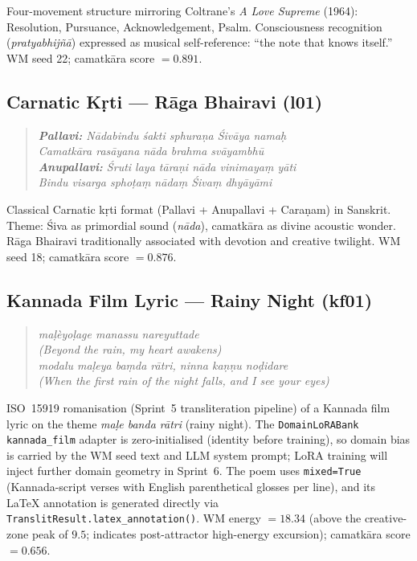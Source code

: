 \documentclass[journal,onecolumn,11pt]{IEEEtran}
\begin{document}
Four-movement structure mirroring Coltrane's \emph{A Love Supreme} (1964):
Resolution, Pursuance, Acknowledgement, Psalm.
Consciousness recognition (\emph{pratyabhijñā}) expressed as musical self-reference:
``the note that knows itself.''
WM seed 22; camatkāra score $= 0.891$.

\subsection{Carnatic Kṛti --- Rāga Bhairavi (l01)}\label{sec:l01}

\begin{quote}
\small\itshape
\textbf{Pallavi:} Nādabindu śakti sphuraṇa Śivāya namaḥ \\
Camatkāra rasāyana nāda brahma svāyambhū \\[2pt]
\textbf{Anupallavi:} Śruti laya tāraṇi nāda vinimayaṃ yāti \\
Bindu visarga sphoṭaṃ nādaṃ Śivaṃ dhyāyāmi
\end{quote}

Classical Carnatic kṛti format (Pallavi + Anupallavi + Caraṇam) in Sanskrit.
Theme: Śiva as primordial sound (\emph{nāda}), camatkāra as divine acoustic wonder.
Rāga Bhairavi traditionally associated with devotion and creative twilight.
WM seed 18; camatkāra score $= 0.876$.

\subsection{Kannada Film Lyric --- Rainy Night (kf01)}\label{sec:kf01}

\begin{quote}
\small\itshape
ma\d{l}\`{e}yo\d{l}age manassu nareyuttade \\
(Beyond the rain, my heart awakens) \\
modalu ma\d{l}eya ba\d{m}da r\={a}tri, ninna ka\d{n}\d{n}u no\d{d}idare \\
(When the first rain of the night falls, and I see your eyes)
\end{quote}

ISO~15919 romanisation (Sprint~5 transliteration pipeline) of a Kannada film lyric
on the theme \emph{ma\d{l}e banda r\={a}tri} (rainy night).
The \texttt{DomainLoRABank} \texttt{kannada\_film} adapter is zero-initialised
(identity before training), so domain bias is carried by the WM seed text and
LLM system prompt; LoRA training will inject further domain geometry in Sprint~6.
The poem uses \texttt{mixed=True} (Kannada-script verses with English parenthetical
glosses per line), and its \LaTeX{} annotation is generated directly via
\texttt{TranslitResult.latex\_annotation()}.
WM energy $= 18.34$ (above the creative-zone peak of $9.5$; indicates
post-attractor high-energy excursion); camatkāra score $= 0.656$.
\end{document}
